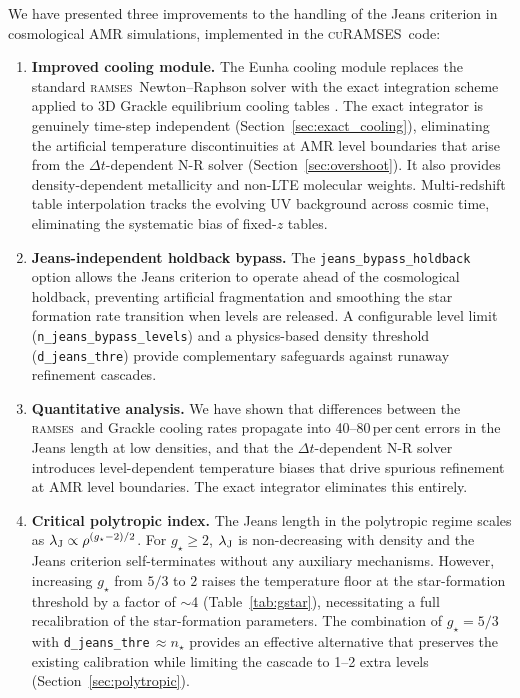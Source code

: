 \documentclass[fleqn,usenatbib]{mnras}
\newcommand{\lJ}{\lambda_{\rm J}}
\newcommand{\nstar}{n_\star}
\newcommand{\gstar}{g_\star}
\newcommand{\ramses}{\textsc{ramses}}
\newcommand{\curamses}{\textsc{cuRAMSES}}
\newcommand{\code}[1]{\texttt{#1}}
\begin{document}
We have presented three improvements to the handling of the Jeans
criterion in cosmological AMR simulations, implemented in the
\curamses\ code:

\begin{enumerate}
  \item \textbf{Improved cooling module.}  The Eunha cooling module
    replaces the standard \ramses\ Newton--Raphson solver with the
    \citet{Townsend2009} exact integration scheme applied to 3D Grackle
    equilibrium cooling tables \citep{Smith2017}.  The exact integrator
    is genuinely time-step independent
    (Section~\ref{sec:exact_cooling}), eliminating the artificial
    temperature discontinuities at AMR level boundaries that arise from
    the $\Delta t$-dependent N-R solver
    (Section~\ref{sec:overshoot}).  It also provides
    density-dependent metallicity and non-LTE molecular weights.
    Multi-redshift table interpolation tracks the evolving UV
    background \citep{HM2012} across cosmic time, eliminating the
    systematic bias of fixed-$z$ tables.

  \item \textbf{Jeans-independent holdback bypass.}  The
    \code{jeans\_bypass\_holdback} option allows the Jeans criterion to
    operate ahead of the cosmological holdback, preventing artificial
    fragmentation and smoothing the star formation rate transition when
    levels are released.  A configurable level limit
    (\code{n\_jeans\_bypass\_levels}) and a physics-based density
    threshold (\code{d\_jeans\_thre}) provide complementary safeguards
    against runaway refinement cascades.

  \item \textbf{Quantitative analysis.}  We have shown that differences
    between the \ramses\ and Grackle cooling rates propagate into
    40--80\,per\,cent errors in the Jeans length at low densities, and
    that the $\Delta t$-dependent N-R solver introduces level-dependent
    temperature biases that drive spurious refinement at AMR level
    boundaries.  The exact integrator eliminates this entirely.

  \item \textbf{Critical polytropic index.}  The Jeans length in the
    polytropic regime scales as $\lJ \propto \rho^{(\gstar-2)/2}$.
    For $\gstar \ge 2$, $\lJ$ is non-decreasing with density and the
    Jeans criterion self-terminates without any auxiliary mechanisms.
    However, increasing $\gstar$ from $5/3$ to $2$ raises the
    temperature floor at the star-formation threshold by a factor
    of $\sim$4 (Table~\ref{tab:gstar}), necessitating a full
    recalibration of the star-formation parameters.  The combination
    of $\gstar = 5/3$ with \code{d\_jeans\_thre}$\,\approx\nstar$
    provides an effective alternative that preserves the existing
    calibration while limiting the cascade to 1--2 extra levels
    (Section~\ref{sec:polytropic}).


\end{enumerate}
\end{document}

